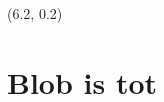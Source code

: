 \documentclass[10pt]{article}
\begin{document}
\begin{textblock}{15}(6.2, 0.2)

\section{Blob is tot}

%
%
%
%
%

\end{textblock}
\end{document}
